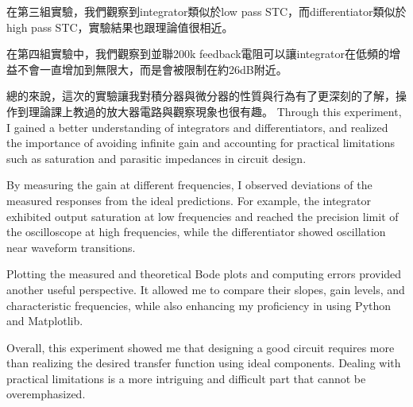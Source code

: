 \documentclass[a4paper,12pt]{article}
\begin{document}
在第三組實驗，我們觀察到integrator類似於low pass STC，而differentiator類似於high pass STC，實驗結果也跟理論值很相近。

在第四組實驗中，我們觀察到並聯200k feedback電阻可以讓integrator在低頻的增益不會一直增加到無限大，而是會被限制在約26dB附近。

總的來說，這次的實驗讓我對積分器與微分器的性質與行為有了更深刻的了解，操作到理論課上教過的放大器電路與觀察現象也很有趣。
Through this experiment, I gained a better understanding of integrators and differentiators, and realized the importance of avoiding infinite gain and accounting for practical limitations such as saturation and parasitic impedances in circuit design.

By measuring the gain at different frequencies, I observed deviations of the measured responses from the ideal predictions. For example, the integrator exhibited output saturation at low frequencies and reached the precision limit of the oscilloscope at high frequencies, while the differentiator showed oscillation near waveform transitions.

Plotting the measured and theoretical Bode plots and computing errors provided another useful perspective. It allowed me to compare their slopes, gain levels, and characteristic frequencies, while also enhancing my proficiency in using Python and Matplotlib.

Overall, this experiment showed me that designing a good circuit requires more than realizing the desired transfer function using ideal components. Dealing with practical limitations is a more intriguing and difficult part that cannot be overemphasized.
\end{document}
